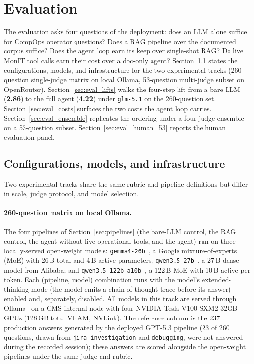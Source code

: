 \section{Evaluation}
\label{sec:evaluation}

The evaluation asks four questions of the deployment: does an
LLM alone suffice for CompOps operator questions? Does a RAG
pipeline over the documented corpus suffice? Does the agent
loop earn its keep over single-shot RAG? Do live MonIT tool
calls earn their cost over a doc-only agent?
Section~\ref{sec:eval_methodology} states the configurations,
models, and infrastructure for the two experimental tracks
(260-question single-judge matrix on local Ollama, 53-question
multi-judge subset on OpenRouter).
Section~\ref{sec:eval_lifts} walks the four-step lift from a
bare LLM (\textbf{2.86}) to the full agent (\textbf{4.22})
under \texttt{glm-5.1} on the 260-question set.
Section~\ref{sec:eval_costs} surfaces the two costs the agent
loop carries.
Section~\ref{sec:eval_ensemble} replicates the ordering under a
four-judge ensemble on a 53-question subset.
Section~\ref{sec:eval_human_53} reports the human evaluation
panel.

\subsection{Configurations, models, and infrastructure}
\label{sec:eval_methodology}

Two experimental tracks share the same rubric and pipeline
definitions but differ in scale, judge protocol, and model
selection.

\paragraph{260-question matrix on local Ollama.}
The four pipelines of Section~\ref{sec:pipelines} (the bare-LLM
control, the RAG control, the agent without live operational
tools, and the agent) run on three locally-served open-weight
models: \texttt{gemma4-26b}~\cite{gemma4card}, a Google
mixture-of-experts (MoE) with 26\,B total and 4\,B active
parameters; \texttt{qwen3.5-27b}~\cite{qwen3report}, a 27\,B
dense model from Alibaba; and
\texttt{qwen3.5-122b-a10b}~\cite{qwen3report}, a 122\,B MoE
with 10\,B active per token. Each (pipeline, model) combination
runs with the model's extended-thinking mode (the model emits a
chain-of-thought trace before its answer) enabled and,
separately, disabled. All models in this track are served
through Ollama~\cite{ollama} on a CMS-internal node with four
NVIDIA Tesla V100-SXM2-32GB GPUs (128\,GB total VRAM, NVLink).
The reference column is the 237 production answers generated
by the deployed GPT-5.3 pipeline (23 of 260 questions, drawn
from \texttt{jira\_investigation} and \texttt{debugging}, were
not answered during the recorded session); these answers are
scored alongside the open-weight pipelines under the same judge
and rubric.

